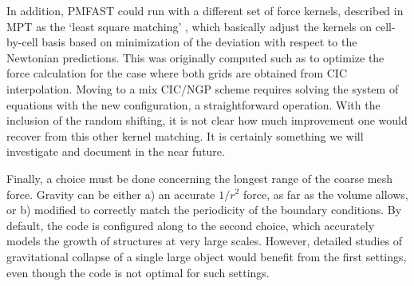 In addition, {\small PMFAST} could run with a different set of force kernels, described in MPT as the `least square matching' , 
which basically adjust the kernels on cell-by-cell basis based on minimization of the deviation with respect
to the Newtonian predictions. This was originally computed such as to optimize the force calculation for
the case where both grids are obtained from CIC interpolation. Moving to a mix CIC/NGP scheme
requires solving the system of equations with the new configuration, a straightforward operation.
 With the inclusion of the random shifting, it is not clear how much improvement 
one would recover from this other kernel matching.  It is certainly something
we will investigate and document in the near future.


Finally, a choice must be done concerning the longest range of the coarse mesh force. Gravity can be either a) an accurate $1/r^2$ force, as far as the volume allows, 
or b) modified to correctly match the periodicity of the boundary conditions. By default, the code is configured along to the second choice,
which accurately models the growth of structures at very large scales. However, detailed studies of gravitational collapse of a single large object would benefit 
from the first settings, even though the code is not optimal for such settings.

